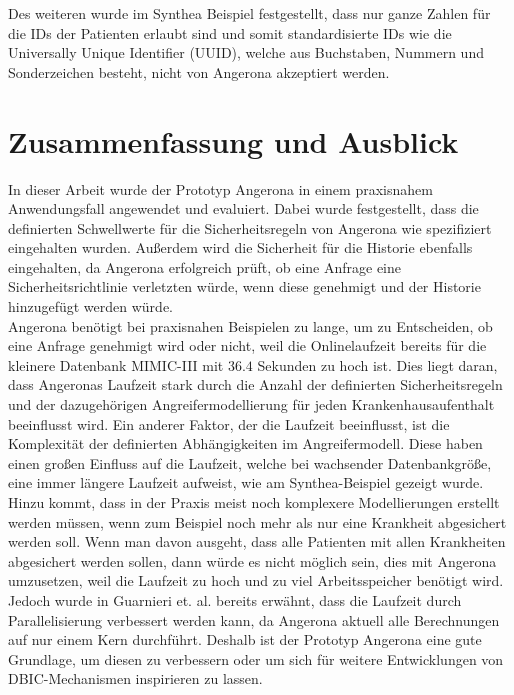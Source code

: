 \documentclass[german,version-2020-11]{uzl-thesis}
\begin{document}
Des weiteren wurde im Synthea Beispiel festgestellt, dass nur ganze Zahlen für die IDs der Patienten erlaubt sind und somit standardisierte IDs wie die  Universally Unique Identifier (UUID), welche aus Buchstaben, Nummern und Sonderzeichen besteht, nicht von Angerona akzeptiert werden. \\ 

\chapter{Zusammenfassung und Ausblick} \label{chap:Zusammenfassung}
In dieser Arbeit wurde der Prototyp Angerona in einem praxisnahem Anwendungsfall angewendet und evaluiert. Dabei wurde festgestellt, dass die definierten Schwellwerte für die Sicherheitsregeln von Angerona wie spezifiziert eingehalten wurden. Außerdem wird die Sicherheit für die Historie ebenfalls eingehalten, da Angerona erfolgreich prüft, ob eine Anfrage eine Sicherheitsrichtlinie verletzten würde, wenn diese genehmigt und der Historie hinzugefügt werden würde. \\
Angerona benötigt bei praxisnahen Beispielen zu lange, um zu Entscheiden, ob eine Anfrage genehmigt wird oder nicht, weil die Onlinelaufzeit bereits für die kleinere Datenbank MIMIC-III mit $36.4$ Sekunden zu hoch ist. Dies liegt daran, dass Angeronas Laufzeit stark durch die Anzahl der definierten Sicherheitsregeln und der dazugehörigen Angreifermodellierung für jeden Krankenhausaufenthalt beeinflusst wird. Ein anderer Faktor, der die Laufzeit beeinflusst, ist die Komplexität der definierten Abhängigkeiten im Angreifermodell. Diese haben einen großen Einfluss auf die Laufzeit, welche bei wachsender Datenbankgröße, eine immer längere Laufzeit aufweist, wie am Synthea-Beispiel gezeigt wurde. \\ 
Hinzu kommt, dass in der Praxis meist noch komplexere Modellierungen erstellt werden müssen, wenn zum Beispiel noch mehr als nur eine Krankheit abgesichert werden soll. Wenn man davon ausgeht, dass alle Patienten mit allen Krankheiten abgesichert werden sollen, dann würde es nicht möglich sein, dies mit Angerona umzusetzen, weil die Laufzeit zu hoch und zu viel Arbeitsspeicher benötigt wird.
Jedoch wurde in  Guarnieri et. al. \cite{guarnieri2017securing} bereits erwähnt, dass die Laufzeit durch Parallelisierung verbessert werden kann, da Angerona aktuell alle Berechnungen auf nur einem Kern durchführt. Deshalb ist der Prototyp Angerona eine gute Grundlage, um diesen zu verbessern oder um sich für weitere Entwicklungen von DBIC-Mechanismen inspirieren zu lassen. \\ 
\end{document}
